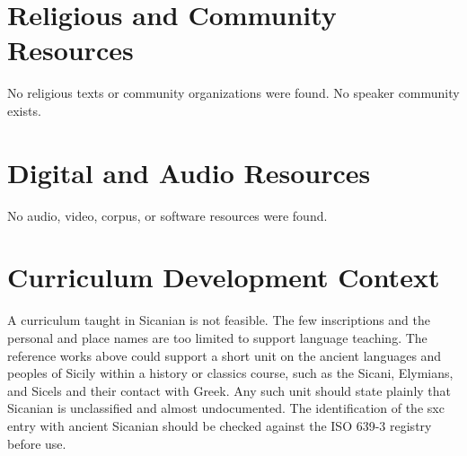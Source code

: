 \documentclass[12pt]{article}
\begin{document}
\section{Religious and Community Resources}
No religious texts or community organizations were found. No speaker community exists.

\section{Digital and Audio Resources}
No audio, video, corpus, or software resources were found.

\section{Curriculum Development Context}
A curriculum taught in Sicanian is not feasible. The few inscriptions and the personal and place names are too limited to support language teaching. The reference works above could support a short unit on the ancient languages and peoples of Sicily within a history or classics course, such as the Sicani, Elymians, and Sicels and their contact with Greek. Any such unit should state plainly that Sicanian is unclassified and almost undocumented. The identification of the sxc entry with ancient Sicanian should be checked against the ISO 639-3 registry before use.
\end{document}
